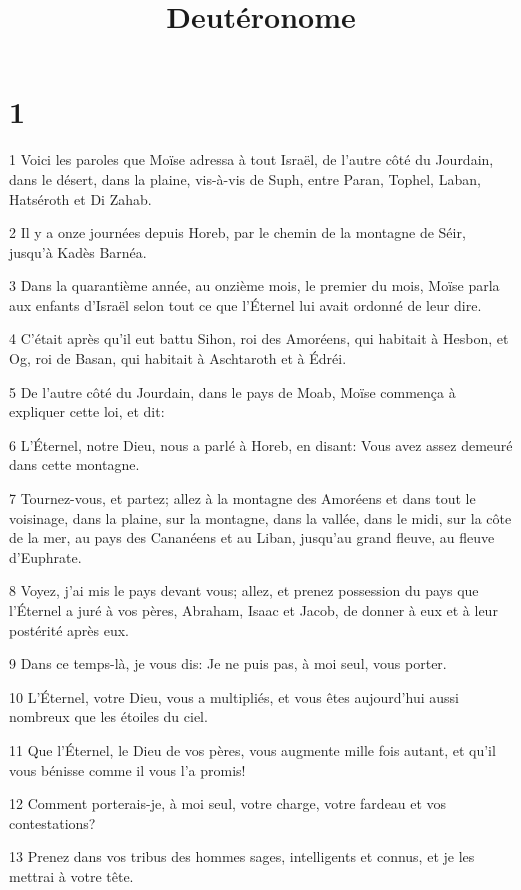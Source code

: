 

\title{Deutéronome}


\chapter{1}

\par 1 Voici les paroles que Moïse adressa à tout Israël, de l'autre côté du Jourdain, dans le désert, dans la plaine, vis-à-vis de Suph, entre Paran, Tophel, Laban, Hatséroth et Di Zahab.
\par 2 Il y a onze journées depuis Horeb, par le chemin de la montagne de Séir, jusqu'à Kadès Barnéa.
\par 3 Dans la quarantième année, au onzième mois, le premier du mois, Moïse parla aux enfants d'Israël selon tout ce que l'Éternel lui avait ordonné de leur dire.
\par 4 C'était après qu'il eut battu Sihon, roi des Amoréens, qui habitait à Hesbon, et Og, roi de Basan, qui habitait à Aschtaroth et à Édréi.
\par 5 De l'autre côté du Jourdain, dans le pays de Moab, Moïse commença à expliquer cette loi, et dit:
\par 6 L'Éternel, notre Dieu, nous a parlé à Horeb, en disant: Vous avez assez demeuré dans cette montagne.
\par 7 Tournez-vous, et partez; allez à la montagne des Amoréens et dans tout le voisinage, dans la plaine, sur la montagne, dans la vallée, dans le midi, sur la côte de la mer, au pays des Cananéens et au Liban, jusqu'au grand fleuve, au fleuve d'Euphrate.
\par 8 Voyez, j'ai mis le pays devant vous; allez, et prenez possession du pays que l'Éternel a juré à vos pères, Abraham, Isaac et Jacob, de donner à eux et à leur postérité après eux.
\par 9 Dans ce temps-là, je vous dis: Je ne puis pas, à moi seul, vous porter.
\par 10 L'Éternel, votre Dieu, vous a multipliés, et vous êtes aujourd'hui aussi nombreux que les étoiles du ciel.
\par 11 Que l'Éternel, le Dieu de vos pères, vous augmente mille fois autant, et qu'il vous bénisse comme il vous l'a promis!
\par 12 Comment porterais-je, à moi seul, votre charge, votre fardeau et vos contestations?
\par 13 Prenez dans vos tribus des hommes sages, intelligents et connus, et je les mettrai à votre tête.
